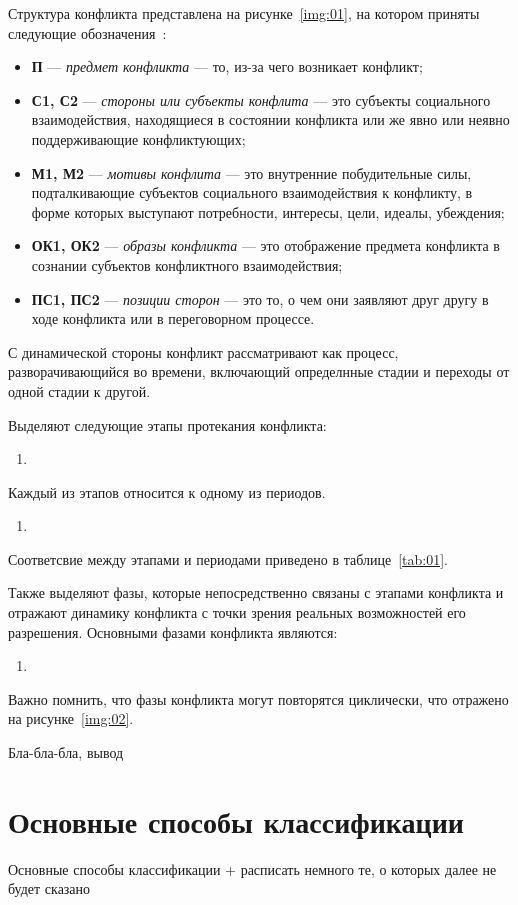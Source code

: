 Структура конфликта представлена на рисунке~\ref{img:01}, на котором
приняты следующие обозначения~\cite{book03}:
\begin{itemize}
    \item \textbf{П} --- \textit{предмет конфликта} --- то, из-за чего возникает
        конфликт;
    \item \textbf{С1, С2} --- \textit{стороны или субъекты конфлита} ---
        это субъекты социального взаимодействия, находящиеся в
        состоянии конфликта или же явно или неявно поддерживающие
        конфликтующих;
    \item \textbf{М1, М2} --- \textit{мотивы конфлита} --- это внутренние
        побудительные силы, подталкивающие субъектов социального взаимодействия
        к конфликту, в форме которых выступают потребности, интересы,
        цели, идеалы, убеждения;
    \item \textbf{ОК1, ОК2} --- \textit{образы конфликта} --- это
        отображение предмета конфликта в сознании субъектов конфликтного
        взаимодействия;
    \item \textbf{ПС1, ПС2} --- \textit{позиции сторон} --- это то,
        о чем они заявляют друг другу в ходе конфликта или в переговорном
        процессе.
\end{itemize}


С динамической стороны конфликт рассматривают как процесс,
разворачивающийся во времени, включающий определнные стадии и переходы от
одной стадии к другой.

Выделяют следующие этапы протекания конфликта:
\begin{enumerate}
    \item
\end{enumerate}

Каждый из этапов относится к одному из периодов.
\begin{enumerate}
    \item
\end{enumerate}

Соответсвие между этапами и периодами приведено в таблице~\ref{tab:01}.

Также выделяют фазы, которые непосредственно связаны с этапами конфликта и
отражают динамику конфликта с точки зрения реальных возможностей его
разрешения. Основными фазами конфликта являются:
\begin{enumerate}
    \item
\end{enumerate}

Важно помнить, что фазы конфликта могут повторятся циклически, что отражено
на рисунке~\ref{img:02}.

Бла-бла-бла, вывод

\section{Основные способы классификации}
Основные способы классификации + расписать немного те, о которых далее не будет
сказано

